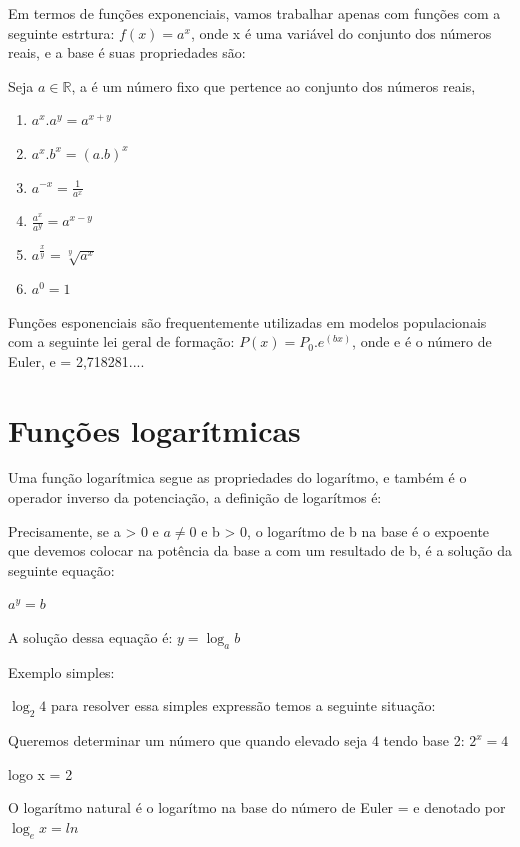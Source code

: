 \begin{multicols*}{2}
    Em termos de funções exponenciais, vamos trabalhar apenas com funções com a seguinte estrtura:
    $f(x) = a^x$, onde x é uma variável do conjunto dos números reais, e a base é suas propriedades 		são:

    Seja $a \in \mathbb{R}$, a é um número fixo que pertence ao conjunto dos números reais,
    \begin{enumerate}
        \item $a^{x}.a^{y} = a^{x+y}$
        \item $a^x.b^x = (a.b)^{x}$
        \item $a^{-x} = \frac{1}{a^x}$
        \item $\frac{a^x}{a^y} = a^{x - y}$
        \item $ a^{\frac{x}{y}}  = \sqrt[y]{a^x}$
        \item $a^0 = 1$
    \end{enumerate}

    Funções esponenciais são frequentemente utilizadas em modelos populacionais com a seguinte lei 			geral de formação: $P(x) = P_0 . e^{(bx)}$, onde e é o número de Euler, e = 2,718281....


    \section{Funções logarítmicas}
    Uma função logarítmica segue as propriedades do logarítmo, e também é o operador inverso da 			potenciação, a definição de logarítmos é:

    \begin{theorem}
        Precisamente, se a > 0 e $a \ne 0$  e b > 0, o logarítmo de b na base é o expoente que 				devemos colocar na potência da base a com um resultado de b, é a solução da seguinte equação:

        $a^{y} = b$

        A solução dessa equação é: $y = \log_a b$

    \end{theorem}

    Exemplo simples:

    $\log_2 4 $ para resolver essa simples expressão temos a seguinte situação:

    Queremos determinar um número que quando elevado seja 4 tendo base 2: $2^x = 4$

    logo x = 2

    O logarítmo natural é o logarítmo na base do número de Euler = e denotado por $\log_e x = ln$


\end{multicols*}
